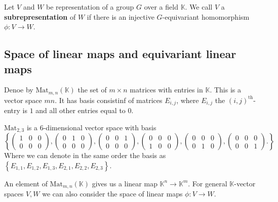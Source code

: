 \documentclass[12pt, a4paper]{article}
\newcommand{\KK}{\mathbb{K}}
\newcommand{\mat}{\text{Mat}}
\begin{document}
\begin{definition}
    Let \(V\) and \(W\) be representation of a group \(G\) over a field \(\KK\). We call \(V\) a \textbf{subrepresentation} of \(W\) if there is an injective \(G\)-equivariant homomorphism \(\phi:V \to W\).
\end{definition}

\subsection{Space of linear maps and equivariant linear maps}

\begin{definition}
    Denoe by \(\mat_{m,n}(\KK)\) the set of \(m \times n\) matrices with entries in \(\KK\). This is a vector space \(mn\). It has basis consistinf of matrices \(E_{i,j}\), where \(E_{i,j}\) the \((i,j)^{\text{th}}\)-entry is \(1\) and all other entries equal to \(0\).
\end{definition}

\begin{example}
    \(\mat_{2,3}\) is a \(6\)-dimensional vector space with basis 
    \[\left\{ 
        \begin{pmatrix} 1 & 0 & 0 \\ 0 & 0 & 0 \end{pmatrix},
        \begin{pmatrix} 0 & 1 & 0 \\ 0 & 0 & 0 \end{pmatrix},
        \begin{pmatrix} 0 & 0 & 1 \\ 0 & 0 & 0 \end{pmatrix},
        \begin{pmatrix} 0 & 0 & 0 \\ 1 & 0 & 0 \end{pmatrix},
        \begin{pmatrix} 0 & 0 & 0 \\ 0 & 1 & 0 \end{pmatrix},
        \begin{pmatrix} 0 & 0 & 0 \\ 0 & 0 & 1 \end{pmatrix}.\right\}\]
    Where we can denote in the same order the basis as \(\left\{ E_{1,1},E_{1,2},E_{1,3},E_{2,1},E_{2,2},E_{2,3}  \right\}\).
\end{example}

\begin{mdremark}
    An element of \(\mat_{m,n}(\KK)\) gives us a linear map \(\KK^n \to \KK^m\). For general \(\KK\)-vector spaces \(V,W\) we can also consider the space of linear maps \(\phi:V \to W\).
\end{mdremark}
\end{document}
